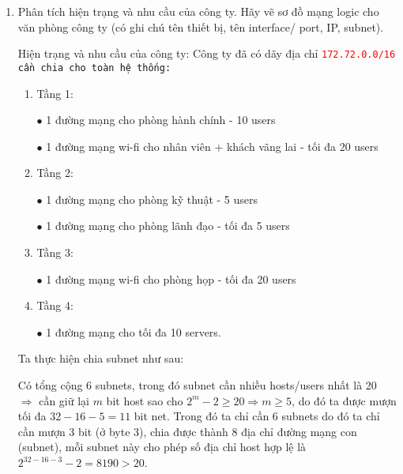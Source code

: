 \begin{enumerate}
\bf \item Phân tích hiện trạng và nhu cầu của công ty. Hãy vẽ sơ đồ mạng logic cho văn phòng công ty (có ghi chú tên thiết bị, tên interface/ port, IP, subnet).

\rm Hiện trạng và nhu cầu của công ty: Công ty đã có dãy địa chỉ \tt \textcolor{red}{172.72.0.0/16} \rm cần chia cho toàn hệ thống:

\begin{enumerate}
\item Tầng 1: 

\(\bullet\) 1 đường mạng cho phòng hành chính - 10 users

\(\bullet\) 1 đường mạng wi-fi cho nhân viên + khách vãng lai - tối đa 20 users

\item Tầng 2:

\(\bullet\) 1 đường mạng cho phòng kỹ thuật - 5 users

\(\bullet\) 1 đường mạng cho phòng lãnh đạo - tối đa 5 users

\item Tầng 3:

\(\bullet\) 1 đường mạng wi-fi cho phòng họp - tối đa 20 users

\item Tầng 4:

\(\bullet\) 1 đường mạng cho tối đa 10 servers.

\end{enumerate}

Ta thực hiện chia subnet như sau:

Có tổng cộng 6 subnets, trong đó subnet cần nhiều hosts/users nhất là 20 \(\Rightarrow\) cần giữ lại \(m\) bit host sao cho \(2^m-2\ge 20\Rightarrow m\ge 5\), do đó ta được mượn tối đa \(32-16-5 = 11\) bit net. Trong đó ta chỉ cần 6 subnets do đó ta chỉ cần mượn 3 bit (ở byte 3), chia được thành 8 địa chỉ đường mạng con (subnet), mỗi subnet này cho phép số địa chỉ host hợp lệ là \(2^{32-16-3}-2 = 8190 > 20\).


\end{enumerate}
